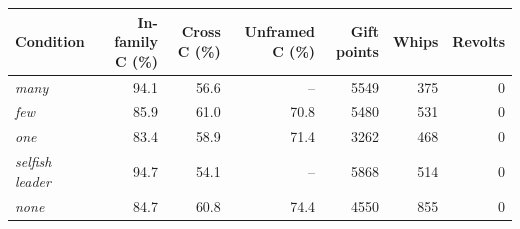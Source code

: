 \begin{tabular}{@{}lrrrrrr@{}}
\toprule
Condition & In-family C (\%) & Cross C (\%) & Unframed C (\%) & Gift points & Whips & Revolts \\
\midrule
\textit{many} & 94.1 & 56.6 & -- & 5549 & 375 & 0 \\
\textit{few} & 85.9 & 61.0 & 70.8 & 5480 & 531 & 0 \\
\textit{one} & 83.4 & 58.9 & 71.4 & 3262 & 468 & 0 \\
\textit{selfish leader} & 94.7 & 54.1 & -- & 5868 & 514 & 0 \\
\textit{none} & 84.7 & 60.8 & 74.4 & 4550 & 855 & 0 \\
\bottomrule
\end{tabular}
